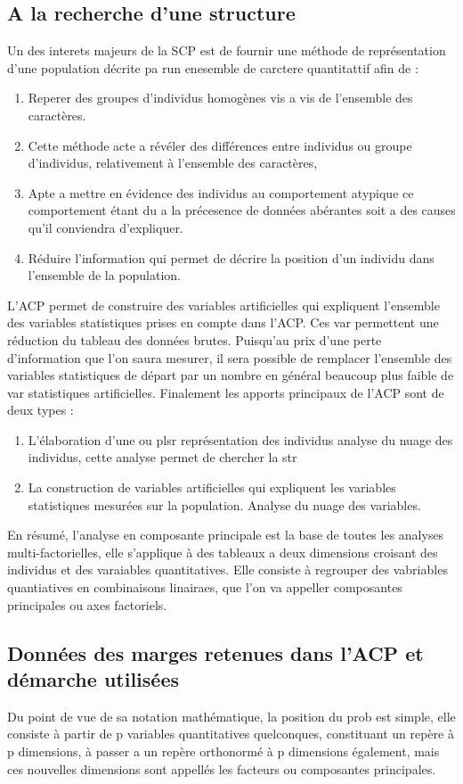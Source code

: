 \documentclass[a4paper]{article}
\begin{document}
\subsection{A la recherche d'une structure}
Un des interets majeurs de la SCP est de fournir une  méthode de représentation d'une population décrite pa run enesemble de carctere quantitattif
afin de : 
\begin{enumerate}
    \item Reperer des groupes d'individus homogènes vis a vis de l'ensemble des caractères.    
    \item Cette méthode acte a révéler des différences entre individus ou groupe d'individus, relativement à l'ensemble des caractères, 
    \item Apte a mettre en évidence des individus au comportement atypique ce comportement étant du a la précesence de données abérantes soit a des 
        causes qu'il conviendra d'expliquer.
    \item Réduire l'information qui permet de décrire la position d'un individu dans l'ensemble de la population.
\end{enumerate}
L'ACP permet de construire des variables artificielles qui expliquent l'ensemble des variables statistiques prises en compte dans l'ACP. Ces var
permettent une réduction du tableau des données brutes. Puisqu'au prix d'une perte d'information que l'on saura mesurer, il sera possible de remplacer
l'ensemble des variables statistiques de départ par un nombre en général beaucoup plus faible de var statistiques artificielles. Finalement les apports
principaux de l'ACP sont de deux types :
\begin{enumerate}
    \item L'élaboration d'une ou plsr représentation des individus analyse du nuage des individus, cette analyse permet de chercher la str
    \item La construction de variables artificielles qui expliquent les variables statistiques mesurées sur la population. Analyse du nuage des
        variables.
\end{enumerate}
En résumé, l'analyse en composante principale est la base de toutes les analyses multi-factorielles, elle s'applique à des tableaux a deux dimensions
croisant des individus et des varaiables quantitatives. Elle consiste à regrouper des vabriables quantiatives en combinaisons linairaes, que l'on va
appeller composantes principales ou axes factoriels.

\subsection{Données des marges retenues dans l'ACP et démarche utilisées}
Du point de vue de sa notation mathématique, la position du prob est simple, elle consiste à partir de p variables quantitatives quelconques,
constituant un repère à p dimensions, à passer a un repère orthonormé à p dimensions également, mais ces nouvelles dimensions sont appellés les
facteurs ou composantes principales. 
\end{document}
